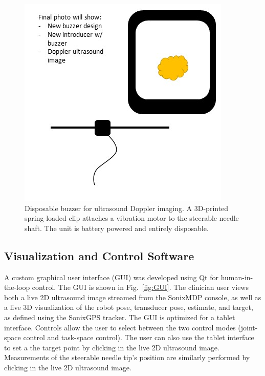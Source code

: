\begin{figure}[!t]
\centering
\includegraphics[width = 0.4\columnwidth]{./Images/Chapter5/Buzzer/DRAFTBuzzer.jpg}%
\caption[Disposable buzzer]{Disposable buzzer for ultrasound Doppler imaging. A 3D-printed spring-loaded clip attaches a vibration motor to the steerable needle shaft. The unit is battery powered and entirely disposable.}
\label{fig:Buzzer}
\end{figure}  

\subsection{Visualization and Control Software}
A custom graphical user interface (GUI) was developed using Qt for human-in-the-loop control. The GUI is shown in Fig.~\ref{fig:GUI}. The clinician user views both a live 2D ultrasound image streamed from the SonixMDP console, as well as a live 3D visualization of the robot pose, transducer pose, estimate, and target, as defined using the SonixGPS tracker. The GUI is optimized for a tablet interface. Controls allow the user to select between the two control modes (joint-space control and task-space control). The user can also use the tablet interface to set a the target point by clicking in the live 2D ultrasound image. Measurements of the steerable needle tip's position are similarly performed by clicking in the live 2D ultrasound image. 

